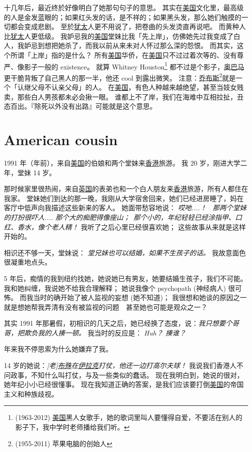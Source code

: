 \documentclass[12pt]{report}
\newcommand{\speechCn}[1]{\textrm{\textit{\textcolor{Speech}{#1}}}}
\newcommand*\dashh{\,\,\textemdash\kern-1pt\textemdash\,\,}
\begin{document}
十几年后，最近终於好像明白了她那句句子的意思。 其实在\uline{美国}文化里，最高级的人是金发蓝眼的；如果红头发的话，是不祥的；如果黑头发，那么她们触摸的一切都会变成悲剧。 至於\uline{犹太}人更不用说了，把卷曲的头发烫直再说吧。 而黄种人比\uline{犹太}人更低级。 我妒忌我的\uline{美国}堂妹比我「先上岸」，仿佛她先过我变成了白人，我妒忌到想把她杀了，而我以前从来未对人怀过那么深的怨恨。 而其实，这个所谓「上岸」指的是什么？ 所有\uline{美国}华侨，在\uline{美国}只不过过着次等的、没有尊严、像影子一般的 existence。 就算 Whitney Houston\footnote{(1963-2012) \uline{美国}黑人女歌手，她的歌词里叫人要懂得自爱，不要活在别人的影子下，我中学时老师播给我们听。} 都不过是个影子，\uline{奥巴马}更干脆背叛了自己黑人的那一半，他还 cool 到露出微笑。  注意：\uline{乔布斯}\footnote{(1955-2011) 苹果电脑的创始人}就是一个「认继父母不认亲父母」的人。 在\uline{美国}，有色人种越来越绝望，甚至当妓女贱卖，那些白人男孩都未必会揪一眼。 谁都上不了岸，我们在海难中互相拉扯，丑态百出。『除死以外没有出路』可能就是这个意思。

\chapter{American cousin}

1991 年（\resultb 年前），来自\uline{美国}的伯娘和两个堂妹来\uline{香港}旅游。 我 20 岁，刚进大学二年，堂妹 14 岁。

那时候家里很热闹，来自\uline{英国}的表弟也和一个白人朋友来\uline{香港}旅游，所有人都住在我家。  堂妹她们到达的那一晚，我刚从大学宿舍回来，她们已经进房睡了，妈在客厅中低声向我描述这些新来的客人。    她面带愁容地说： \speechCn{哎吔....！ \ 那两个堂妹的打扮很吓人.... 那个大的痴肥得像座山；\  那个小的，年纪轻轻已经涂指甲、口红、香水，像个老人精！}   我听了之后心里已经很喜欢她； 这些故事从来就是这样开始的。

相识还不够一天，堂妹说： \speechCn{堂兄妹也可以结婚，如果不生孩子的话。} 我故意面色很凝重地点头。

5 年后，痴情的我到纽约找她，她说她已有男友，她要结婚生孩子，我们不可能。 我和她纠缠，我说她不给我合理解释； 她说我像个 psychopath (神经病人) 很可怖。 而我当时的确开始了被人监视的妄想 (她不知道)； 我很想和她谈的原因之一就是想她帮我弄清有没有被监视的问题 \dashh 甚至她也可能是观众之一？

其实 1991 年那暑假，初相识的几天之后，她已经换了态度，说：\speechCn{我只想要个哥哥，把欺负我的人揍一顿。} 我当时的反应是： \speechCn{Huh？ 揍谁？}

\resultb 年来我不停思索为什么她嫌弃了我。

14 岁的她说：\speechCn{[老]\uline{布殊}在\uline{伊拉克}打仗，他还一边打高尔夫球！} 我说我们香港人不问政事，不知什么叫打仗，与及一些类似的蠢话。  现在我明白到，她说的很对，她年纪小小已经很懂事。  现在我知道正确的答案，是我们应该要打倒\uline{美国}的帝国主义和种族歧视。
\end{document}
